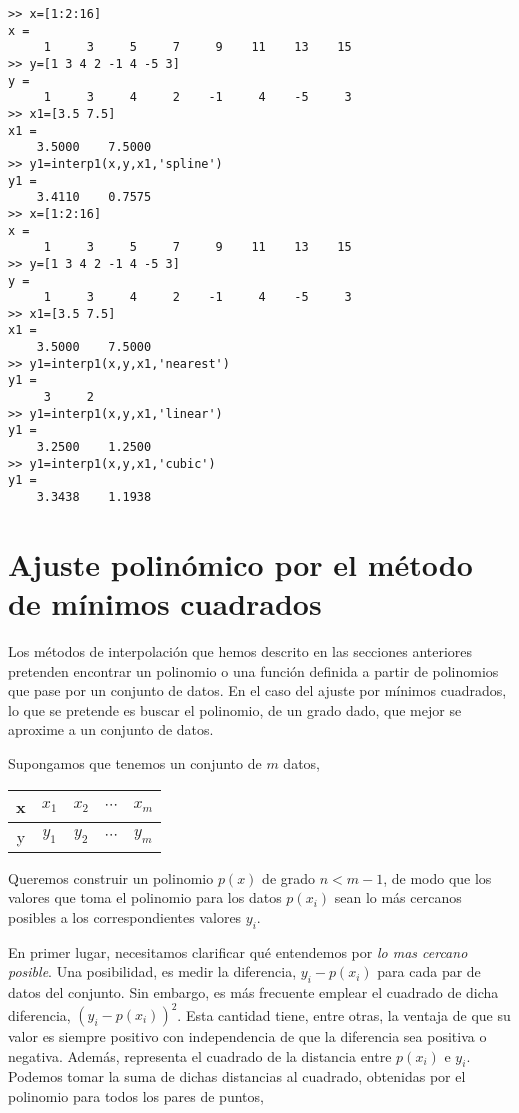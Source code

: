 \begin{verbatim}
>> x=[1:2:16]
x =
     1     3     5     7     9    11    13    15
>> y=[1 3 4 2 -1 4 -5 3]
y =
     1     3     4     2    -1     4    -5     3
>> x1=[3.5 7.5]
x1 =
    3.5000    7.5000
>> y1=interp1(x,y,x1,'spline')
y1 =
    3.4110    0.7575
>> x=[1:2:16]
x =
     1     3     5     7     9    11    13    15
>> y=[1 3 4 2 -1 4 -5 3]
y =
     1     3     4     2    -1     4    -5     3
>> x1=[3.5 7.5]
x1 =
    3.5000    7.5000
>> y1=interp1(x,y,x1,'nearest')
y1 =
     3     2
>> y1=interp1(x,y,x1,'linear')
y1 =
    3.2500    1.2500
>> y1=interp1(x,y,x1,'cubic')
y1 =
    3.3438    1.1938
\end{verbatim}

\section{Ajuste polinómico por el método de mínimos cuadrados} 
Los métodos de interpolación que hemos descrito en las secciones anteriores pretenden encontrar un polinomio o una función definida a partir de polinomios que pase por un conjunto de datos. En el caso del ajuste por mínimos cuadrados, lo que se pretende es buscar el polinomio, de un grado dado, que mejor se aproxime a un conjunto de datos.

Supongamos que tenemos un conjunto de $m$ datos, 

\begin{table}[h]
\centering
\begin{tabular}{c|cccc}
x&$x_1$&$x_2$&$\cdots$&$x_m$\\
\hline
y&$y_1$&$y_2$&$\cdots$&$y_m$
\end{tabular}
\end{table} 
 
Queremos construir un polinomio $p(x)$  de grado $n < m-1$, de modo que los valores que toma el polinomio para los datos $p(x_i)$ sean lo más cercanos posibles a los correspondientes valores $y_i$. 

En primer lugar, necesitamos clarificar qué entendemos por \emph{lo mas cercano posible}.  Una posibilidad, es medir la diferencia, $y_i-p(x_i)$ para cada par de datos del conjunto. Sin embargo, es más frecuente emplear el cuadrado de dicha diferencia, $\left(y_i-p(x_i)\right)^2$. Esta cantidad tiene, entre otras, la ventaja de que su valor es siempre positivo con  independencia de que la diferencia sea positiva o negativa. Además, representa el cuadrado de la distancia entre $p(x_i)$ e $y_i$. Podemos tomar la suma de dichas distancias al cuadrado, obtenidas por el polinomio para todos los pares de puntos, 

